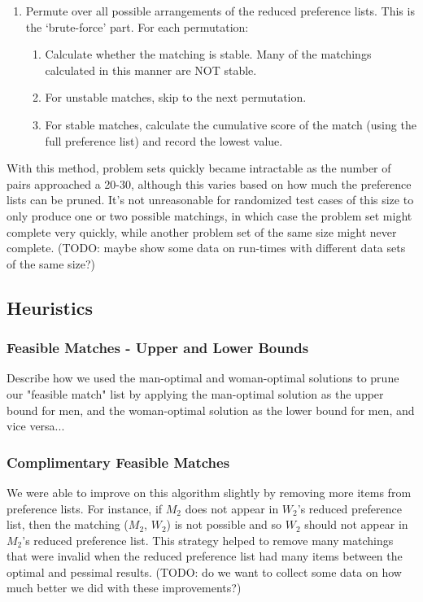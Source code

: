 \documentclass[a4paper]{article}
\begin{document}
\begin{enumerate}
    \item Permute over all possible arrangements of the reduced preference lists. This is the `brute-force' part. For each permutation:
    \begin{enumerate}
        \item Calculate whether the matching is stable. Many of the matchings calculated in this manner are NOT stable.
        \item For unstable matches, skip to the next permutation.
        \item For stable matches, calculate the cumulative score of the match (using the full preference list) and record the lowest value.
    \end{enumerate}

\end{enumerate}

With this method, problem sets quickly became intractable as the number of pairs approached a 20-30, although this varies based on how much the preference lists can be pruned. It's not unreasonable for randomized test cases of this size to only produce one or two possible matchings, in which case the problem set might complete very quickly, while another problem set of the same size might never complete. (TODO: maybe show some data on run-times with different data sets of the same size?)

\subsection{Heuristics}
\subsubsection{Feasible Matches - Upper and Lower Bounds}
Describe how we used the man-optimal and woman-optimal solutions to prune our "feasible match" list by applying the man-optimal solution as the upper bound for men, and the woman-optimal solution as the lower bound for men, and vice versa...

\subsubsection{Complimentary Feasible Matches}
We were able to improve on this algorithm slightly by removing more items from preference lists. For instance, if $M_2$ does not appear in $W_2$'s reduced preference list, then the matching ($M_2$, $W_2$) is not possible and so $W_2$ should not appear in $M_2$'s reduced preference list. This strategy helped to remove many matchings that were invalid when the reduced preference list had many items between the optimal and pessimal results. (TODO: do we want to collect some data on how much better we did with these improvements?)
\end{document}
